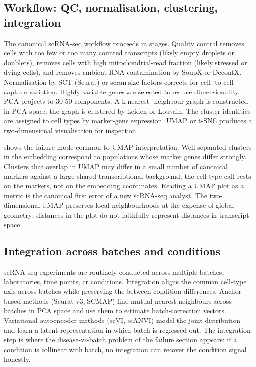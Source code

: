 \subsection{Workflow: QC, normalisation, clustering, integration}

The canonical scRNA-seq workflow \cite{paper:v6c11-stuart-scrnaseq-2019}
proceeds in stages. Quality control removes cells with too few or too
many counted transcripts (likely empty droplets or doublets), removes
cells with high mitochondrial-read fraction (likely stressed or dying
cells), and removes ambient-RNA contamination by SoupX or DecontX.
Normalisation by SCT (Seurat) or scran size-factors corrects for cell-
to-cell capture variation. Highly variable genes are selected to
reduce dimensionality. PCA projects to 30-50 components. A k-nearest-
neighbour graph is constructed in PCA space; the graph is clustered by
Leiden or Louvain. The cluster identities are assigned to cell types
by marker-gene expression. UMAP or t-SNE produces a two-dimensional
visualisation for inspection.



 shows the failure mode common to
UMAP interpretation. Well-separated clusters in the embedding
correspond to populations whose marker genes differ strongly. Clusters
that overlap in UMAP may differ in a small number of canonical
markers against a large shared transcriptional background; the
cell-type call rests on the markers, not on the embedding coordinates.
Reading a UMAP plot as a metric is the canonical first error of a
new scRNA-seq analyst. The two-dimensional UMAP preserves local
neighbourhoods at the expense of global geometry; distances in the
plot do not faithfully represent distances in transcript space.

\subsection{Integration across batches and conditions}

scRNA-seq experiments are routinely conducted across multiple batches,
laboratories, time points, or conditions. Integration aligns the
common cell-type axis across batches while preserving the
between-condition differences. Anchor-based methods (Seurat v3,
SCMAP) find mutual nearest neighbours across batches in PCA space and
use them to estimate batch-correction vectors. Variational autoencoder
methods (scVI, scANVI) model the joint distribution and learn a latent
representation in which batch is regressed out. The integration step
is where the disease-vs-batch problem of the failure section appears:
if a condition is collinear with batch, no integration can recover the
condition signal honestly.

